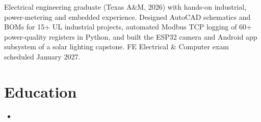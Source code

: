 \documentclass[11pt,letterpaper,sans]{moderncv}
\begin{document}
\makecvtitle


\vspace{-4pt}
\small{Electrical engineering graduate (Texas A\&M, 2026) with hands-on industrial, power-metering and embedded experience. Designed AutoCAD schematics and BOMs for 15+ UL industrial projects, automated Modbus TCP logging of 60+ power-quality registers in Python, and built the ESP32 camera and Android app subsystem of a solar lighting capstone. FE Electrical \& Computer exam scheduled January 2027.}


\section{Education}
\begin{itemize}
\item{}
\end{itemize}

\end{document}
